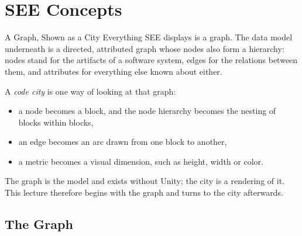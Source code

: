 
\section{SEE Concepts}



\begin{frame}{A Graph, Shown as a City}
  Everything SEE displays is a graph. The data model underneath is a directed,
  attributed graph whose nodes also form a hierarchy: nodes stand for the
  artifacts of a software system, edges for the relations between them, and
  attributes for everything else known about either.
  \vspace{1ex}

  A \emph{code city} is one way of looking at that graph:
  \begin{itemize}
    \item a node becomes a block, and the node hierarchy becomes the nesting of
      blocks within blocks,
    \item an edge becomes an arc drawn from one block to another,
    \item a metric becomes a visual dimension, such as height, width or color.
  \end{itemize}
  \vspace{1ex}

  The graph is the model and exists without Unity; the city is a rendering of
  it. This lecture therefore begins with the graph and turns to the city
  afterwards.
\end{frame}

\subsection{The Graph}


